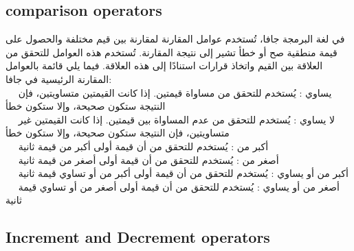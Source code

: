 \subsection{comparison operators}
\begin{AR}
  في لغة البرمجة جافا، تُستخدم عوامل المقارنة 
   لمقارنة بين قيم مختلفة والحصول على قيمة منطقية \LR{)}صح أو خطأ\LR{(} تشير إلى نتيجة المقارنة. تُستخدم هذه العوامل للتحقق من العلاقة بين القيم واتخاذ قرارات استنادًا إلى هذه العلاقة. فيما يلي قائمة بالعوامل المقارنة الرئيسية في جافا:
\newpage
  \\
\ \ \LR{\textcolor{theme}{- 1}}  يساوي \LR{(==)}: يُستخدم للتحقق من مساواة قيمتين. إذا كانت القيمتين متساويتين، فإن النتيجة ستكون صحيحة، وإلا ستكون خطأ  
\\
\ \ \LR{\textcolor{theme}{- 2}}    لا يساوي \LR{(!=)}: يُستخدم للتحقق من عدم المساواة بين قيمتين. إذا كانت القيمتين غير متساويتين، فإن النتيجة ستكون صحيحة، وإلا ستكون خطأ
\\
\ \ \LR{\textcolor{theme}{- 3}}    أكبر من \LR{(<)}: يُستخدم للتحقق من أن قيمة أولى أكبر من قيمة ثانية
\\
\ \ \LR{\textcolor{theme}{- 4}}    أصغر من \LR{(>)}: يُستخدم للتحقق من أن قيمة أولى أصغر من قيمة ثانية
\\
\ \ \LR{\textcolor{theme}{- 5}}      أكبر من أو يساوي \LR{(<=)}: يُستخدم للتحقق من أن قيمة أولى أكبر من أو تساوي قيمة ثانية
\\
\ \ \LR{\textcolor{theme}{- 6}}   أصغر من أو يساوي \LR{(>=)}: يُستخدم للتحقق من أن قيمة أولى أصغر من أو تساوي قيمة ثانية
\end{AR}

\subsection{Increment and Decrement operators}

